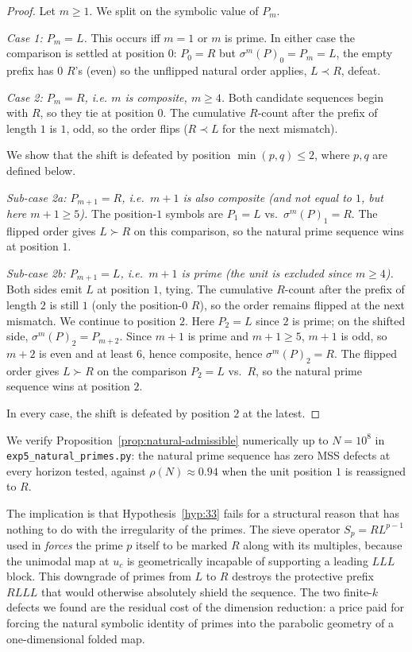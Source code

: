 \documentclass{iopjournal}
\theoremstyle{definition}
\begin{document}
\begin{proof}
Let $m \geq 1$. We split on the symbolic value of $P_m$.

\emph{Case 1: $P_m = L$.} This occurs iff $m = 1$ or $m$ is prime. In
either case the comparison is settled at position $0$: $P_0 = R$ but
$\sigma^m(P)_0 = P_m = L$, the empty prefix has $0$ $R$'s (even) so the
unflipped natural order applies, $L \prec R$, defeat.

\emph{Case 2: $P_m = R$, i.e. $m$ is composite, $m \geq 4$.} Both
candidate sequences begin with $R$, so they tie at position $0$. The
cumulative $R$-count after the prefix of length $1$ is $1$, odd, so the
order flips ($R \prec L$ for the next mismatch).

We show that the shift is defeated by position $\min(p, q) \leq 2$,
where $p, q$ are defined below.

\emph{Sub-case 2a: $P_{m+1} = R$, i.e.\ $m + 1$ is also composite (and
not equal to $1$, but here $m + 1 \geq 5$).} The position-$1$ symbols
are $P_1 = L$ vs.\ $\sigma^m(P)_1 = R$. The flipped order gives
$L \succ R$ on this comparison, so the natural prime sequence wins at
position $1$.

\emph{Sub-case 2b: $P_{m+1} = L$, i.e.\ $m + 1$ is prime (the unit is
excluded since $m \geq 4$).} Both sides emit $L$ at position $1$, tying.
The cumulative $R$-count after the prefix of length $2$ is still $1$
(only the position-$0$ $R$), so the order remains flipped at the next
mismatch. We continue to position $2$. Here $P_2 = L$ since $2$ is
prime; on the shifted side, $\sigma^m(P)_2 = P_{m+2}$. Since $m + 1$ is
prime and $m + 1 \geq 5$, $m + 1$ is odd, so $m + 2$ is even and at
least $6$, hence composite, hence $\sigma^m(P)_2 = R$. The flipped
order gives $L \succ R$ on the comparison $P_2 = L$ vs.\ $R$, so the
natural prime sequence wins at position $2$.

In every case, the shift is defeated by position $2$ at the latest.
\end{proof}

We verify Proposition~\ref{prop:natural-admissible} numerically up to
$N = 10^8$ in \texttt{exp5\_natural\_primes.py}: the natural prime
sequence has zero MSS defects at every horizon tested, against
$\rho(N) \approx 0.94$ when the unit position $1$ is reassigned to $R$.

The implication is that Hypothesis~\ref{hyp:33} fails for a structural
reason that has nothing to do with the irregularity of the primes. The
sieve operator $S_p = R L^{p-1}$ used in \cite{wang2026emergence}
\emph{forces} the prime $p$ itself to be marked $R$ along with its
multiples, because the unimodal map at $u_c$ is geometrically incapable
of supporting a leading $L L L$ block. This downgrade of primes from
$L$ to $R$ destroys the protective prefix $R L L L$ that would otherwise
absolutely shield the sequence. The two finite-$k$ defects we found are
the residual cost of the dimension reduction: a price paid for forcing
the natural symbolic identity of primes into the parabolic geometry of
a one-dimensional folded map.
\end{document}
